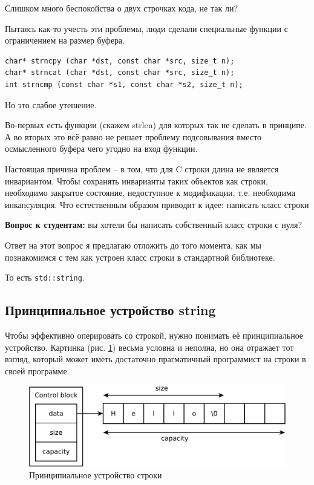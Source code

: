 \documentclass[a4paper,12pt,oneside]{book}
\begin{document}
Слишком много беспокойства о двух строчках кода, не так ли?

Пытаясь как-то учесть эти проблемы, люди сделали специальные функции с ограничением на размер буфера.

\begin{lstlisting}
char* strncpy (char *dst, const char *src, size_t n);
char* strncat (char *dst, const char *src, size_t n);
int strncmp (const char *s1, const char *s2, size_t n);
\end{lstlisting}

Но это слабое утешение.

Во-первых есть функции (скажем strlen) для которых так не сделать в принципе. А во вторых это всё равно не решает проблему подсовывания вместо осмысленного буфера чего угодно на вход функции.

Настоящая причина проблем – в том, что для C строки длина не является инвариантом. Чтобы сохранять инварианты таких объектов как строки, необходимо закрытое состояние, недоступное к модификации, т.е. необходима инкапсуляция. Что естественным образом приводит к идее: написать класс строки

\textbf{Вопрос к студентам:} вы хотели бы написать собственный класс строки с нуля?

Ответ на этот вопрос я предлагаю отложить до того момента, как мы познакомимся с тем как устроен класс строки в стандартной библиотеке.

То есть \lstinline!std::string!.

\subsection{Принципиальное устройство string}\label{subsub:strings}

Чтобы эффективно оперировать со строкой, нужно понимать её принципиальное устройство. Картинка (рис. \ref{fig:string-principal}) весьма условна и неполна, но она отражает тот взгляд, который может иметь достаточно прагматичный программист на строки в своей программе.

\begin{figure}[ht]
\centering
\includegraphics[width=1.0\textwidth]{illustrations/string-principal-crop.pdf}
\caption{Принципиальное устройство строки}
\label{fig:string-principal}
\end{figure}
\end{document}
